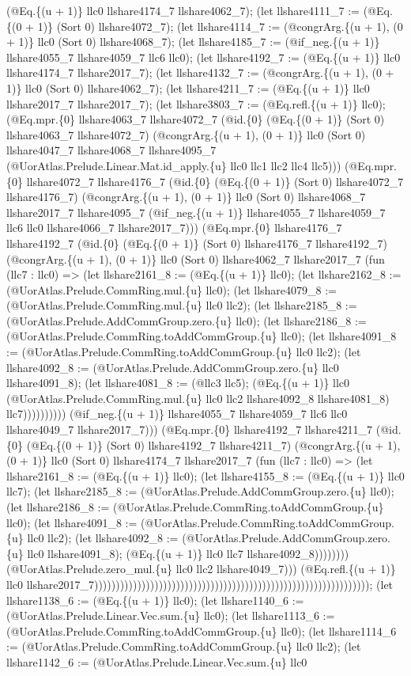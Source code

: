 \documentclass[11pt]{article}
\begin{document}
(@Eq.\{(u + 1)\} llc0 llshare4174\_7 llshare4062\_7); (let llshare4111\_7 := (@Eq.\{(0 + 1)\} (Sort 0) llshare4072\_7); (let llshare4114\_7 := (@congrArg.\{(u + 1), (0 + 1)\} llc0 (Sort 0) llshare4068\_7); (let llshare4185\_7 := (@if\_neg.\{(u + 1)\} llshare4055\_7 llshare4059\_7 llc6 llc0); (let llshare4192\_7 := (@Eq.\{(u + 1)\} llc0 llshare4174\_7 llshare2017\_7); (let llshare4132\_7 := (@congrArg.\{(u + 1), (0 + 1)\} llc0 (Sort 0) llshare4062\_7); (let llshare4211\_7 := (@Eq.\{(u + 1)\} llc0 llshare2017\_7 llshare2017\_7); (let llshare3803\_7 := (@Eq.refl.\{(u + 1)\} llc0); (@Eq.mpr.\{0\} llshare4063\_7 llshare4072\_7 (@id.\{0\} (@Eq.\{(0 + 1)\} (Sort 0) llshare4063\_7 llshare4072\_7) (@congrArg.\{(u + 1), (0 + 1)\} llc0 (Sort 0) llshare4047\_7 llshare4068\_7 llshare4095\_7 (@UorAtlas.Prelude.Linear.Mat.id\_apply.\{u\} llc0 llc1 llc2 llc4 llc5))) (@Eq.mpr.\{0\} llshare4072\_7 llshare4176\_7 (@id.\{0\} (@Eq.\{(0 + 1)\} (Sort 0) llshare4072\_7 llshare4176\_7) (@congrArg.\{(u + 1), (0 + 1)\} llc0 (Sort 0) llshare4068\_7 llshare2017\_7 llshare4095\_7 (@if\_neg.\{(u + 1)\} llshare4055\_7 llshare4059\_7 llc6 llc0 llshare4066\_7 llshare2017\_7))) (@Eq.mpr.\{0\} llshare4176\_7 llshare4192\_7 (@id.\{0\} (@Eq.\{(0 + 1)\} (Sort 0) llshare4176\_7 llshare4192\_7) (@congrArg.\{(u + 1), (0 + 1)\} llc0 (Sort 0) llshare4062\_7 llshare2017\_7 (fun (llc7 : llc0) => (let llshare2161\_8 := (@Eq.\{(u + 1)\} llc0); (let llshare2162\_8 := (@UorAtlas.Prelude.CommRing.mul.\{u\} llc0); (let llshare4079\_8 := (@UorAtlas.Prelude.CommRing.mul.\{u\} llc0 llc2); (let llshare2185\_8 := (@UorAtlas.Prelude.AddCommGroup.zero.\{u\} llc0); (let llshare2186\_8 := (@UorAtlas.Prelude.CommRing.toAddCommGroup.\{u\} llc0); (let llshare4091\_8 := (@UorAtlas.Prelude.CommRing.toAddCommGroup.\{u\} llc0 llc2); (let llshare4092\_8 := (@UorAtlas.Prelude.AddCommGroup.zero.\{u\} llc0 llshare4091\_8); (let llshare4081\_8 := (@llc3 llc5); (@Eq.\{(u + 1)\} llc0 (@UorAtlas.Prelude.CommRing.mul.\{u\} llc0 llc2 llshare4092\_8 llshare4081\_8) llc7)))))))))) (@if\_neg.\{(u + 1)\} llshare4055\_7 llshare4059\_7 llc6 llc0 llshare4049\_7 llshare2017\_7))) (@Eq.mpr.\{0\} llshare4192\_7 llshare4211\_7 (@id.\{0\} (@Eq.\{(0 + 1)\} (Sort 0) llshare4192\_7 llshare4211\_7) (@congrArg.\{(u + 1), (0 + 1)\} llc0 (Sort 0) llshare4174\_7 llshare2017\_7 (fun (llc7 : llc0) => (let llshare2161\_8 := (@Eq.\{(u + 1)\} llc0); (let llshare4155\_8 := (@Eq.\{(u + 1)\} llc0 llc7); (let llshare2185\_8 := (@UorAtlas.Prelude.AddCommGroup.zero.\{u\} llc0); (let llshare2186\_8 := (@UorAtlas.Prelude.CommRing.toAddCommGroup.\{u\} llc0); (let llshare4091\_8 := (@UorAtlas.Prelude.CommRing.toAddCommGroup.\{u\} llc0 llc2); (let llshare4092\_8 := (@UorAtlas.Prelude.AddCommGroup.zero.\{u\} llc0 llshare4091\_8); (@Eq.\{(u + 1)\} llc0 llc7 llshare4092\_8)))))))) (@UorAtlas.Prelude.zero\_mul.\{u\} llc0 llc2 llshare4049\_7))) (@Eq.refl.\{(u + 1)\} llc0 llshare2017\_7)))))))))))))))))))))))))))))))))))))))))))))))))))))))))))))))); (let llshare1138\_6 := (@Eq.\{(u + 1)\} llc0); (let llshare1140\_6 := (@UorAtlas.Prelude.Linear.Vec.sum.\{u\} llc0); (let llshare1113\_6 := (@UorAtlas.Prelude.CommRing.toAddCommGroup.\{u\} llc0); (let llshare1114\_6 := (@UorAtlas.Prelude.CommRing.toAddCommGroup.\{u\} llc0 llc2); (let llshare1142\_6 := (@UorAtlas.Prelude.Linear.Vec.sum.\{u\} llc0 
\end{document}
